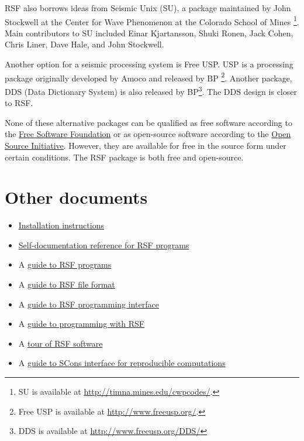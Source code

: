 RSF also borrows ideas from Seismic Unix (SU), a package maintained by John
Stockwell at the Center for Wave Phenomenon at the Colorado School of Mines
\cite[]{TLE16-07-10451049,su}\footnote{SU is available at \url{http://timna.mines.edu/cwpcodes/}.}. Main contributors to SU
included Einar Kjartansson, Shuki Ronen, Jack Cohen, Chris Liner, Dave Hale,
and John Stockwell.

Another option for a seismic processing system is Free USP. USP is a
processing package originally developed by Amoco and released by BP
\footnote{Free USP is available at \url{http://www.freeusp.org/}.}. Another package, DDS (Data Dictionary
System) is also released by BP\footnote{DDS is available at \url{http://www.freeusp.org/DDS/}}. The DDS design is closer to RSF.

None of these alternative packages can be qualified as free software
according to the
\href{http://www.fsf.org/philosophy/free-sw.html}{Free Software Foundation} or as open-source software according to the
\href{http://www.opensource.org/docs/definition.php}{Open Source Initiative}.  However, they are available for free in the source form
under certain conditions. The RSF package is both free and
open-source.

\section{Other documents}

\begin{itemize}
\item  \href{http://egl.beg.utexas.edu/RSF/book/rsf/rsf/install_html/}{Installation instructions}
\item \href{http://egl.beg.utexas.edu/RSF/}{Self-documentation reference for RSF programs}
\item A \href{http://egl.beg.utexas.edu/RSF/book/rsf/rsf/prog_html/}{guide to RSF programs}
\item A \href{http://egl.beg.utexas.edu/RSF/book/rsf/rsf/format_html/}{guide to RSF file format}
\item A \href{http://egl.beg.utexas.edu/RSF/book/rsf/rsf/api_html/}{guide to  RSF programming interface}
\item A \href{http://egl.beg.utexas.edu/RSF/book/rsf/rsf/demo_html/}{guide to programming with RSF}
\item A \href{http://egl.beg.utexas.edu/RSF/book/rsf/rsf/tour_html/}{tour of RSF software}
\item A \href{http://egl.beg.utexas.edu/RSF/book/rsf/scons/paper_html/}{guide to SCons interface for reproducible computations}
\end{itemize}




%


